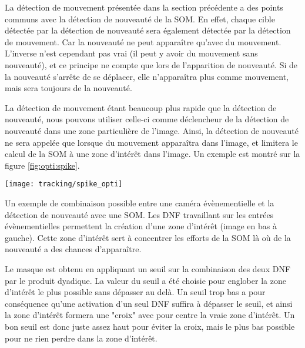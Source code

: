 	La détection de mouvement présentée dans la section précédente a des points communs avec la détection de nouveauté de la SOM. En effet, chaque cible détectée par la détection de nouveauté sera également détectée par la détection de mouvement. Car la nouveauté ne peut apparaître qu'avec du mouvement. L'inverse n'est cependant pas vrai (il peut y avoir du mouvement sans nouveauté), et ce principe ne compte que lors de l'apparition de nouveauté. Si de la nouveauté s'arrête de se déplacer, elle n'apparaîtra plus comme mouvement, mais sera toujours de la nouveauté.

	La détection de mouvement étant beaucoup plus rapide que la détection de nouveauté, nous pouvons utiliser celle-ci comme déclencheur de la détection de nouveauté dans une zone particulière de l'image. Ainsi, la détection de nouveauté ne sera appelée que lorsque du mouvement apparaîtra dans l'image, et limitera le calcul de la SOM à une zone d'intérêt dans l'image. Un exemple est montré sur la figure \ref{fig:opti:spike}.

	\begin{figureth}
		\begin{subfigureth}{\textwidth}
			\texttt{[image: tracking/spike\_opti]}
		\end{subfigureth}
		\caption[Combinaison SOM et DNF par zone d'intérêt]{Un exemple de combinaison possible entre une caméra évènementielle et la détection de nouveauté avec une SOM. Les DNF travaillant sur les entrées évènementielles permettent la création d'une zone d'intérêt (image en bas à gauche). Cette zone d'intérêt sert à concentrer les efforts de la SOM là où de la nouveauté a des chances d'apparaître.}\label{fig:opti:spike}
	\end{figureth}

	Le masque est obtenu en appliquant un seuil sur la combinaison des deux DNF par le produit dyadique. La valeur du seuil a été choisie pour englober la zone d'intérêt le plus possible sans dépasser au delà. Un seuil trop bas a pour conséquence qu'une activation d'un seul DNF suffira à dépasser le seuil, et ainsi la zone d'intérêt formera une "croix" avec pour centre la vraie zone d'intérêt. Un bon seuil est donc juste assez haut pour éviter la croix, mais le plus bas possible pour ne rien perdre dans la zone d'intérêt.

